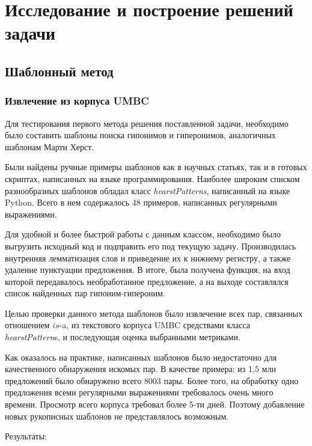 \section{Исследование и построение решений задачи}
\label{sec:Chapter_4} 
\large




\subsection{Шаблонный метод}

\subsubsection{Извлечение из корпуса UMBC}

Для тестирования первого метода решения поставленной задачи, необходимо
было составить шаблоны поиска гипонимов и гиперонимов, аналогичных шаблонам
Марти Херст.

Были найдены ручные примеры шаблонов как в научных статьях, так и в
готовых скриптах, написанных на языке программирования. Наиболее широким
списком разнообразных шаблонов обладал класс \newline
\textit{hearstPatterns}, написанный на
языке Python. Всего в нем содержалось 48 примеров, написанных регулярными
выражениями.

Для удобной и более быстрой работы с данным классом, необходимо было
выгрузить исходный код и подправить его под текущую задачу. Производилась
внутренняя лемматизация слов и приведение их к нижнему регистру, а также
удаление пунктуации предложения. В итоге, была получена функция, на вход
которой передавалось необработанное предложение, а на выходе составлялся
список найденных пар гипоним-гипероним.

Целью проверки данного метода шаблонов было извлечение всех пар, связанных
отношением $is$-a, из текстового корпуса UMBC средствами класса \textit{hearstPattern}s, и
последующая оценка выбранными метриками.

Как оказалось на практике, написанных шаблонов было недостаточно для
качественного обнаружения искомых пар. В качестве примера: из 1,5 млн
предложений было обнаружено всего 8003 пары. Более того, на обработку одно
предложения всеми регулярными выражениями требовалось очень много времени.
Просмотр всего корпуса требовал более 5-ти дней. Поэтому добавление новых
рукописных шаблонов не представлялось возможным.

Результаты:

